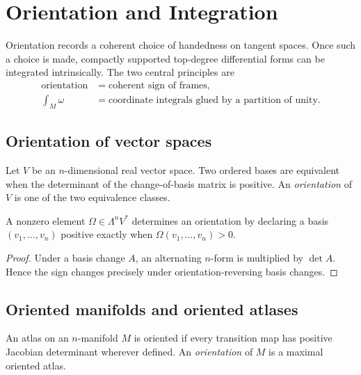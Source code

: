 \chapter{Orientation and Integration}
\label{ch:vii10-orientation-and-integration}

Orientation records a coherent choice of handedness on tangent spaces. Once such a choice is made, compactly supported top-degree differential forms can be integrated intrinsically. The two central principles are
\[
\boxed{\begin{aligned}
\text{orientation}
  &=\text{coherent sign of frames},\\
\int_M\omega
  &=\text{coordinate integrals glued by a partition of unity}.
\end{aligned}}
\]

\section{Orientation of vector spaces}
\begin{definition}\label{def:vii10-vector-orientation}
Let $V$ be an $n$-dimensional real vector space. Two ordered bases are equivalent when the determinant of the change-of-basis matrix is positive. An \emph{orientation} of $V$ is one of the two equivalence classes.
\end{definition}

\begin{proposition}\label{prop:vii10-top-wedge}
A nonzero element $\Omega\in\Lambda^nV^*$ determines an orientation by declaring a basis $(v_1,\dots,v_n)$ positive exactly when $\Omega(v_1,\dots,v_n)>0$.
\end{proposition}
\begin{proof}
Under a basis change $A$, an alternating $n$-form is multiplied by $\det A$. Hence the sign changes precisely under orientation-reversing basis changes.
\end{proof}

\section{Oriented manifolds and oriented atlases}
\begin{definition}\label{def:vii10-oriented-atlas}
An atlas on an $n$-manifold $M$ is oriented if every transition map has positive Jacobian determinant wherever defined. An \emph{orientation} of $M$ is a maximal oriented atlas.
\end{definition}

